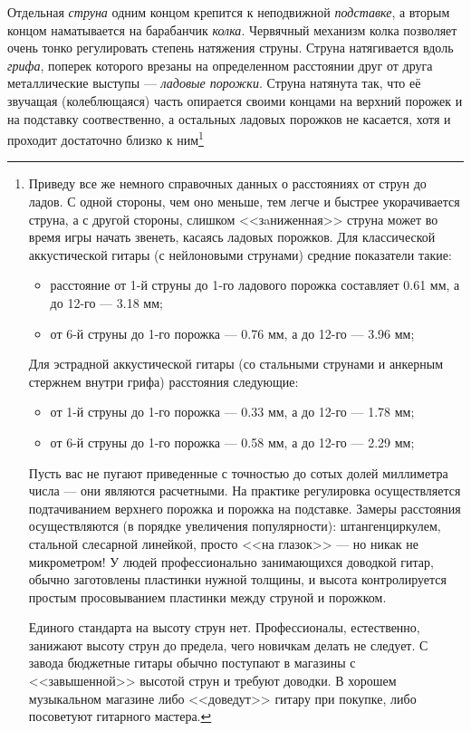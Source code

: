Отдельная \emph{струна} одним концом крепится к неподвижной \emph{подставке}, а вторым концом наматывается на барабанчик \emph{колка}. Червячный механизм колка позволяет очень тонко регулировать степень натяжения струны. Струна натягивается вдоль \emph{грифа}, поперек которого врезаны на определенном расстоянии друг от друга металлические выступы --- \emph{ладовые порожки}. Струна натянута так, что её звучащая (колеблющаяся) часть опирается своими концами на верхний порожек и на подставку соотвественно, а остальных ладовых порожков не касается, хотя и проходит достаточно близко к ним\footnote{
    Приведу все же немного справочных данных о расстояниях от струн до ладов. С одной стороны, чем оно меньше, тем легче и быстрее укорачивается струна, а с другой стороны, слишком <<зaниженная>> струна может во время игры начать звенеть, касаясь ладовых порожков. Для классической аккустической гитары (с нейлоновыми струнами) средние показатели такие: 
    \begin{itemize}
        \item расстояние от 1-й струны до 1-го ладового порожка составляет 0.61 мм, а до 12-го --- 3.18 мм;
        \item от 6-й струны до 1-го порожка --- 0.76 мм, а до 12-го --- 3.96 мм;
    \end{itemize}
    
    Для эстрадной аккустической гитары (со стальными струнами и анкерным стержнем внутри грифа) расстояния следующие:
    \begin{itemize}
        \item от 1-й струны до 1-го порожка --- 0.33 мм, а до 12-го --- 1.78 мм;
        \item от 6-й струны до 1-го порожка --- 0.58 мм, а до 12-го --- 2.29 мм;
    \end{itemize}
    
    Пусть вас не пугают приведенные с точностью до сотых долей миллиметра числа --- они являются расчетными. На практике регулировка осуществляется подтачиванием верхнего порожка и порожка на подставке. Замеры расстояния осуществляются (в порядке увеличения популярности): штангенциркулем, стальной слесарной линейкой, просто <<на глазок>> --- но никак не микрометром! У людей профессионально занимающихся доводкой гитар, обычно заготовлены пластинки нужной толщины, и высота контролируется простым просовыванием пластинки между струной и порожком.
    
    Единого стандарта на высоту струн нет. Профессионалы, естественно, занижают высоту струн до предела, чего новичкам делать не следует. С завода бюджетные гитары обычно поступают в магазины с <<завышенной>> высотой струн и требуют доводки. В хорошем музыкальном магазине либо <<доведут>> гитару при покупке, либо посоветуют гитарного мастера.
}


